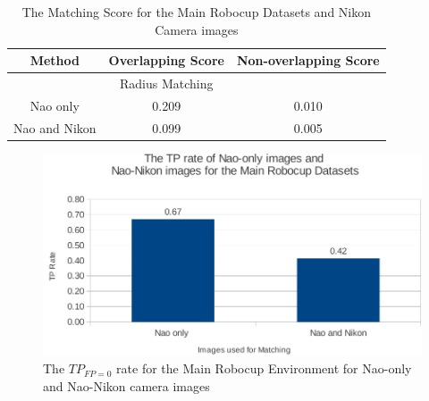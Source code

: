 \documentclass{report}
\begin{document}
\begin{table}
\caption{The Matching Score for the Main Robocup Datasets and Nikon Camera
images}
\begin{tabular}{|c|c|c|}
\hline 
Method & Overlapping Score & Non-overlapping Score\tabularnewline
\hline 
\hline 
 & Radius Matching & \tabularnewline
\hline 
Nao only & 0.209 & 0.010\tabularnewline
\hline 
Nao and Nikon & 0.099 & 0.005\tabularnewline
\hline 
\end{tabular}
\label{tab:nkmrdMS}
\end{table}


\begin{figure}[h!] 
  \centering
    \includegraphics[width=1.0\textwidth]{../Drawings/Graphs/tp_rate_nikon_mrd.pdf}
    \caption{The $TP_{FP=0}$ rate for the Main Robocup Environment for Nao-only and Nao-Nikon camera images}
    \label{fig:tp_rate_nikon_mrd.pdf}
\end{figure}

\end{document}
